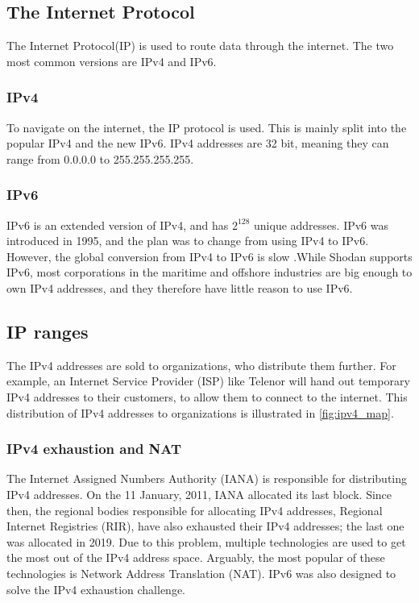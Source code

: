 \subsection{The Internet Protocol}
The Internet Protocol(IP) is used to route data through the internet. The two most common versions are IPv4 and IPv6.

\subsubsection{IPv4}
To navigate on the internet, the IP protocol is used. This is mainly split into the popular IPv4 and the new IPv6. IPv4 addresses are 32 bit, meaning they can range from 0.0.0.0 to 255.255.255.255. 

\subsubsection{IPv6} \label{sec:ipv6}
IPv6 is an extended version of IPv4, and has $2^{128}$ unique addresses. IPv6 was introduced in 1995, and the plan was to change from using IPv4 to IPv6. However, the global conversion from IPv4 to IPv6 is slow .While Shodan supports IPv6, most corporations in the maritime and offshore industries are big enough to own IPv4 addresses, and they therefore have little reason to use IPv6.

\subsection{IP ranges}
The IPv4 addresses are sold to organizations, who distribute them further. For example, an Internet Service Provider (ISP) like Telenor will hand out temporary IPv4 addresses to their customers, to allow them to connect to the internet. This distribution of IPv4 addresses to organizations is illustrated in \cref{fig:ipv4_map}.

\subsubsection{IPv4 exhaustion and NAT}
The Internet Assigned Numbers Authority (IANA) is responsible for distributing IPv4 addresses. On the 11 January, 2011, IANA allocated its last block.\cite{exhasuted_IPV4} Since then, the regional bodies responsible for allocating IPv4 addresses, Regional Internet Registries (RIR), have also exhausted their IPv4 addresses; the last one was allocated in 2019.\cite{exhausted_RIPENNC} Due to this problem, multiple technologies are used to get the most out of the IPv4 address space. Arguably, the most popular of these technologies is Network Address Translation (NAT). IPv6 was also designed to solve the IPv4 exhaustion challenge.

